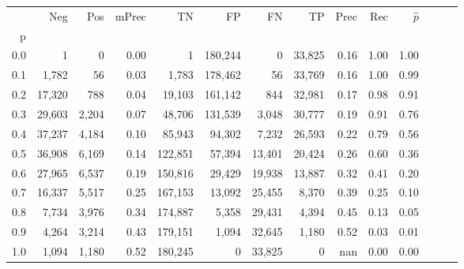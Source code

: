 \begin{tabular}{rrrrrrrrrrrrrr}
\toprule
{} &     Neg &    Pos & mPrec &       TN &       FP &      FN &      TP &  Prec &   Rec & $\hat{p}$ \\
p   &         &        &       &          &          &         &         &       &       &           \\
\midrule
0.0 &       1 &      0 &  0.00 &        1 &  180,244 &       0 &  33,825 &  0.16 &  1.00 &      1.00 \\
0.1 &   1,782 &     56 &  0.03 &    1,783 &  178,462 &      56 &  33,769 &  0.16 &  1.00 &      0.99 \\
0.2 &  17,320 &    788 &  0.04 &   19,103 &  161,142 &     844 &  32,981 &  0.17 &  0.98 &      0.91 \\
0.3 &  29,603 &  2,204 &  0.07 &   48,706 &  131,539 &   3,048 &  30,777 &  0.19 &  0.91 &      0.76 \\
0.4 &  37,237 &  4,184 &  0.10 &   85,943 &   94,302 &   7,232 &  26,593 &  0.22 &  0.79 &      0.56 \\
0.5 &  36,908 &  6,169 &  0.14 &  122,851 &   57,394 &  13,401 &  20,424 &  0.26 &  0.60 &      0.36 \\
0.6 &  27,965 &  6,537 &  0.19 &  150,816 &   29,429 &  19,938 &  13,887 &  0.32 &  0.41 &      0.20 \\
0.7 &  16,337 &  5,517 &  0.25 &  167,153 &   13,092 &  25,455 &   8,370 &  0.39 &  0.25 &      0.10 \\
0.8 &   7,734 &  3,976 &  0.34 &  174,887 &    5,358 &  29,431 &   4,394 &  0.45 &  0.13 &      0.05 \\
0.9 &   4,264 &  3,214 &  0.43 &  179,151 &    1,094 &  32,645 &   1,180 &  0.52 &  0.03 &      0.01 \\
1.0 &   1,094 &  1,180 &  0.52 &  180,245 &        0 &  33,825 &       0 &   nan &  0.00 &      0.00 \\
\bottomrule
\end{tabular}
